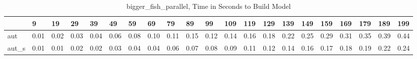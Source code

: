 \begin{table}
\caption{bigger_fish_parallel, Time in Seconds to Build Model}
\label{bigger_fish_parallel_model_time}
\begin{tabular}{lllllllllllllllllllll}
\toprule
 & 9 & 19 & 29 & 39 & 49 & 59 & 69 & 79 & 89 & 99 & 109 & 119 & 129 & 139 & 149 & 159 & 169 & 179 & 189 & 199 \\
\midrule
aut & 0.01 & 0.02 & 0.03 & 0.04 & 0.06 & 0.08 & 0.10 & 0.11 & 0.15 & 0.12 & 0.14 & 0.16 & 0.18 & 0.22 & 0.25 & 0.29 & 0.31 & 0.35 & 0.39 & 0.44 \\
aut_s & 0.01 & 0.01 & 0.02 & 0.02 & 0.03 & 0.04 & 0.04 & 0.06 & 0.07 & 0.08 & 0.09 & 0.11 & 0.12 & 0.14 & 0.16 & 0.17 & 0.18 & 0.19 & 0.22 & 0.24 \\
\bottomrule
\end{tabular}
\end{table}
